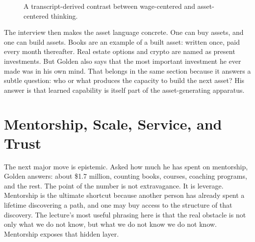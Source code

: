 \begin{figure}[h]
\centering
{}
\caption{A transcript-derived contrast between wage-centered and asset-centered thinking.}
\end{figure}

The interview then makes the asset language concrete. One can buy assets, and one can build assets. Books are an example of a built asset: written once, paid every month thereafter. Real estate options and crypto are named as present investments. But Golden also says that the most important investment he ever made was in his own mind. That belongs in the same section because it answers a subtle question: who or what produces the capacity to build the next asset? His answer is that learned capability is itself part of the asset-generating apparatus.

\section{Mentorship, Scale, Service, and Trust}

The next major move is epistemic. Asked how much he has spent on mentorship, Golden answers: about \$1.7 million, counting books, courses, coaching programs, and the rest. The point of the number is not extravagance. It is leverage. Mentorship is the ultimate shortcut because another person has already spent a lifetime discovering a path, and one may buy access to the structure of that discovery. The lecture's most useful phrasing here is that the real obstacle is not only what we do not know, but what we do not know we do not know. Mentorship exposes that hidden layer.

